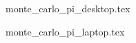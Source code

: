 \documentclass{stdlocal}
\begin{document}
    \begin{table}
      \center
      \caption{}
      \footnotesize
      \renewcommand{\arraystretch}{1.2}
      {monte_carlo_pi_desktop.tex}
    \end{table}
    \begin{table}
      \center
      \caption{}
      \footnotesize
      \renewcommand{\arraystretch}{1.2}
      {monte_carlo_pi_laptop.tex}
    \end{table}
\end{document}

